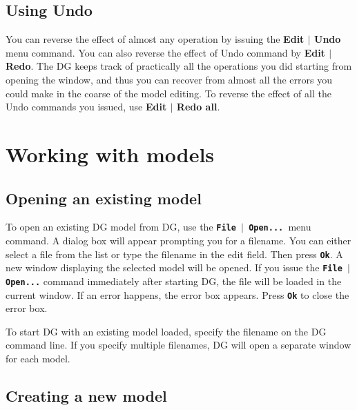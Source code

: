 \documentclass[12pt]{report}
\begin{document}
\section{Using Undo}

You can reverse the effect of almost any operation by issuing the
\textbf{Edit \begin{math}\vert{}\end{math} Undo} menu command. You can
also reverse the effect of Undo command by
\textbf{Edit \begin{math}\vert{}\end{math} Redo}. The DG keeps track of
practically all the operations you did starting from opening the
window, and thus you can recover from almost all the errors you could
make in the coarse of the model editing. To reverse the effect of all
the Undo commands you issued, use
\textbf{Edit \begin{math}\vert{}\end{math} Redo all}.

\chapter{Working with models}
\section{Opening an existing model}

To open an existing DG model from DG, use the
\textbf{\texttt{File \begin{math}\vert{}\end{math} Open... }}menu
command. A dialog box will appear prompting you for a filename. You can
either select a file from the list or type the filename in the edit
field. Then press \textbf{\texttt{Ok}}. A new window displaying the
selected model will be opened. If you issue the
\textbf{\texttt{File \begin{math}\vert{}\end{math} Open...}} command
immediately after starting DG, the file will be loaded in the current
window. If an error happens, the error box appears. Press
\textbf{\texttt{Ok}} to close the error box.

To start DG with an existing model loaded, specify the filename on the
DG command line. If you specify multiple filenames, DG will open a
separate window for each model.

\section{Creating a new model}
\end{document}
